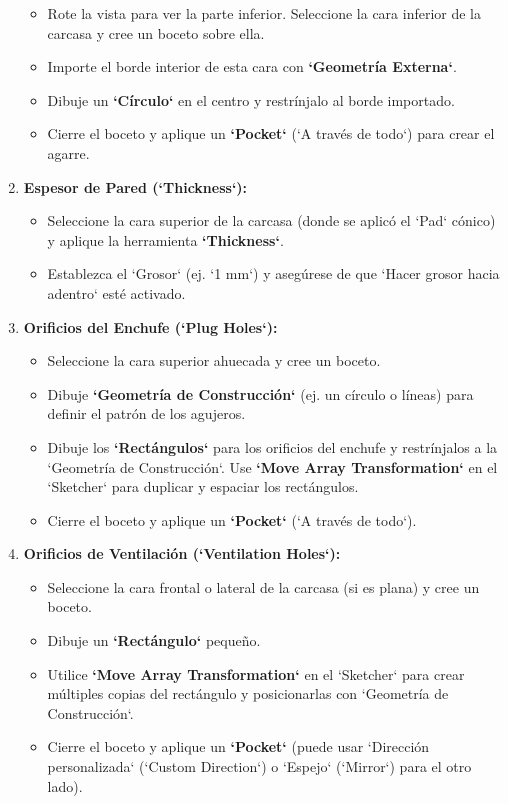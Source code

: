 \documentclass[12pt]{article}
\begin{document}
\begin{enumerate}[label=\arabic*)]
    \begin{itemize}[label=\textendash]
        \item Rote la vista para ver la parte inferior. Seleccione la cara inferior de la carcasa y cree un boceto sobre ella.
        \item Importe el borde interior de esta cara con \textbf{`Geometría Externa`}.
        \item Dibuje un \textbf{`Círculo`} en el centro y restrínjalo al borde importado.
        \item Cierre el boceto y aplique un \textbf{`Pocket`} (`A través de todo`) para crear el agarre.
    \end{itemize}
    \item \textbf{Espesor de Pared (`Thickness`):}
    \begin{itemize}[label=\textendash]
        \item Seleccione la cara superior de la carcasa (donde se aplicó el `Pad` cónico) y aplique la herramienta \textbf{`Thickness`}.
        \item Establezca el `Grosor` (ej. `1 mm`) y asegúrese de que `Hacer grosor hacia adentro` esté activado.
    \end{itemize}
    \item \textbf{Orificios del Enchufe (`Plug Holes`):}
    \begin{itemize}[label=\textendash]
        \item Seleccione la cara superior ahuecada y cree un boceto.
        \item Dibuje \textbf{`Geometría de Construcción`} (ej. un círculo o líneas) para definir el patrón de los agujeros.
        \item Dibuje los \textbf{`Rectángulos`} para los orificios del enchufe y restrínjalos a la `Geometría de Construcción`. Use \textbf{`Move Array Transformation`} en el `Sketcher` para duplicar y espaciar los rectángulos.
        \item Cierre el boceto y aplique un \textbf{`Pocket`} (`A través de todo`).
    \end{itemize}
    \item \textbf{Orificios de Ventilación (`Ventilation Holes`):}
    \begin{itemize}[label=\textendash]
        \item Seleccione la cara frontal o lateral de la carcasa (si es plana) y cree un boceto.
        \item Dibuje un \textbf{`Rectángulo`} pequeño.
        \item Utilice \textbf{`Move Array Transformation`} en el `Sketcher` para crear múltiples copias del rectángulo y posicionarlas con `Geometría de Construcción`.
        \item Cierre el boceto y aplique un \textbf{`Pocket`} (puede usar `Dirección personalizada` (`Custom Direction`) o `Espejo` (`Mirror`) para el otro lado).
    \end{itemize}
\end{enumerate}
\end{document}
